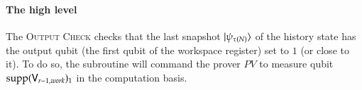 \paragraph{The high level} The \textsc{Output Check} checks that the last snapshot $|\psi_{\tau(N)}\rangle$ of the history state has the output qubit (the first qubit of the workspace register) set to $1$ (or close to it). To do so, the subroutine will command the prover $PV$ to measure  qubit $\operatorname{supp}({\mathsf{V}}_{r-1,work})_1$ in the computation basis. 



